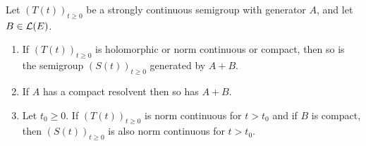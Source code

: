 \begin{theorem} \label{thm:a2-1.30}
Let $(T(t))_{t \geq 0}$ be a strongly continuous semigroup with generator $A$, and let $B \in \mathcal{L}(E)$.

\begin{enumerate}[\upshape(i)]
\item
If $(T(t))_{t \geq 0}$ is holomorphic or norm continuous or compact, then so is the semigroup 
$(S(t))_{t \geq 0}$ 
generated by $A+B$.

\item
If $A$ has a compact resolvent then so has $A+B$.

\item
Let $t_{0} \geq 0$.
If $(T(t))_{t \geq 0}$ is norm continuous for $t > t_{0}$ and if 
$B$ is compact, then $(S(t))_{t \geq 0}$ is also norm continuous for $t > t_{0}$.

\end{enumerate}

\end{theorem}
